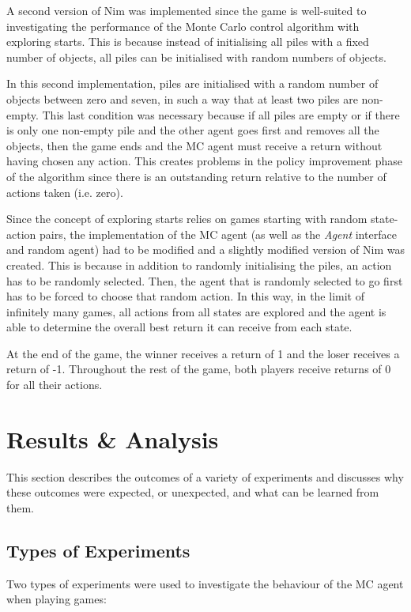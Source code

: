 \documentclass[11pt,a4paper]{report}
\begin{document}
A second version of Nim was implemented since the game is well-suited to investigating the performance of the Monte Carlo control algorithm with exploring starts. This is because instead of initialising all piles with a fixed number of objects, all piles can be initialised with random numbers of objects.

In this second implementation, piles are initialised with a random number of objects between zero and seven, in such a way that at least two piles are non-empty. This last condition was necessary because if all piles are empty or if there is only one non-empty pile and the other agent goes first and removes all the objects, then the game ends and the MC agent must receive a return without having chosen any action. This creates problems in the policy improvement phase of the algorithm since there is an outstanding return relative to the number of actions taken (i.e. zero).

Since the concept of exploring starts relies on games starting with random state-action pairs, the implementation of the MC agent (as well as the \emph{Agent} interface and random agent) had to be modified and a slightly modified version of Nim was created. This is because in addition to randomly initialising the piles, an action has to be randomly selected. Then, the agent that is randomly selected to go first has to be forced to choose that random action. In this way, in the limit of infinitely many games, all actions from all states are explored and the agent is able to determine the overall best return it can receive from each state.

At the end of the game, the winner receives a return of 1 and the loser receives a return of -1. Throughout the rest of the game, both players receive returns of 0 for all their actions.


\chapter{Results \& Analysis}

This section describes the outcomes of a variety of experiments and discusses why these outcomes were expected, or unexpected, and what can be learned from them.


\section{Types of Experiments}

Two types of experiments were used to investigate the behaviour of the MC agent when playing games:
\end{document}

